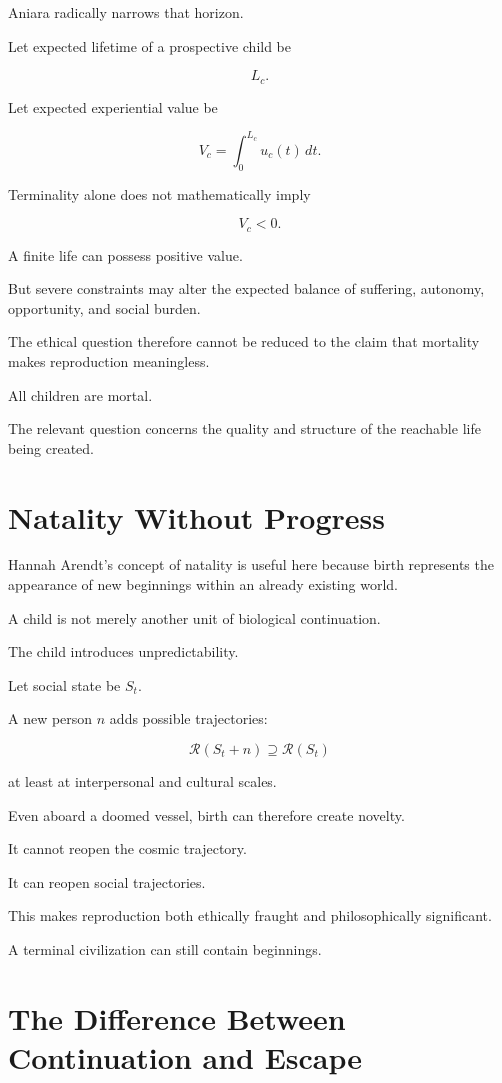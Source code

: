 \documentclass[11pt,oneside]{book}
\theoremstyle{definition}
\theoremstyle{remark}
\newcommand{\R}{\mathcal{R}}
\begin{document}
Aniara radically narrows that horizon.

Let expected lifetime of a prospective child be

\[
L_c.
\]

Let expected experiential value be

\[
V_c
=
\int_0^{L_c}
u_c(t)\,dt.
\]

Terminality alone does not mathematically imply

\[
V_c<0.
\]

A finite life can possess positive value.

But severe constraints may alter the expected balance of suffering, autonomy, opportunity, and social burden.

The ethical question therefore cannot be reduced to the claim that mortality makes reproduction meaningless.

All children are mortal.

The relevant question concerns the quality and structure of the reachable life being created.

\section{Natality Without Progress}

Hannah Arendt's concept of natality is useful here because birth represents the appearance of new beginnings within an already existing world.

A child is not merely another unit of biological continuation.

The child introduces unpredictability.

Let social state be \(S_t\).

A new person \(n\) adds possible trajectories:

\[
\R(S_t+n)
\supseteq
\R(S_t)
\]

at least at interpersonal and cultural scales.

Even aboard a doomed vessel, birth can therefore create novelty.

It cannot reopen the cosmic trajectory.

It can reopen social trajectories.

This makes reproduction both ethically fraught and philosophically significant.

A terminal civilization can still contain beginnings.

\section{The Difference Between Continuation and Escape}
\end{document}

